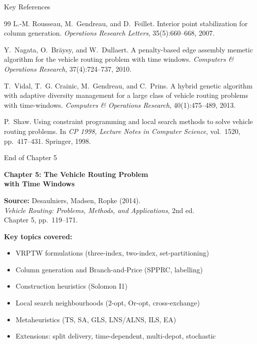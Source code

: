 \documentclass[aspectratio=169,10pt]{beamer}
\begin{document}
\begin{frame}[allowframebreaks]{Key References}
\begin{thebibliography}{99}
  L.-M. Rousseau, M.~Gendreau, and D.~Feillet.
  \newblock Interior point stabilization for column generation.
  \newblock \textit{Operations Research Letters}, 35(5):660--668, 2007.

  Y.~Nagata, O.~Br\"aysy, and W.~Dullaert.
  \newblock A penalty-based edge assembly memetic algorithm for the vehicle
    routing problem with time windows.
  \newblock \textit{Computers \& Operations Research}, 37(4):724--737, 2010.

  T.~Vidal, T.~G. Crainic, M.~Gendreau, and C.~Prins.
  \newblock A hybrid genetic algorithm with adaptive diversity management for a
    large class of vehicle routing problems with time-windows.
  \newblock \textit{Computers \& Operations Research}, 40(1):475--489, 2013.

  P.~Shaw.
  \newblock Using constraint programming and local search methods to solve
    vehicle routing problems.
  \newblock In \textit{CP 1998, Lecture Notes in Computer Science}, vol.~1520,
    pp.~417--431. Springer, 1998.

\end{thebibliography}

\end{frame}

\begin{frame}[allowframebreaks]{End of Chapter 5}
  \begin{center}
    \Large\textbf{Chapter 5: The Vehicle Routing Problem\\with Time Windows}

    \bigskip
    \normalsize
    \textbf{Source:} Desaulniers, Madsen, Ropke (2014).\\
    \textit{Vehicle Routing: Problems, Methods, and Applications}, 2nd ed.\\
    Chapter 5, pp.\ 119--171.

    \bigskip
    \textbf{Key topics covered:}
    \begin{itemize}
      \item VRPTW formulations (three-index, two-index, set-partitioning)
      \item Column generation and Branch-and-Price (SPPRC, labelling)
      \item Construction heuristics (Solomon I1)
      \item Local search neighbourhoods (2-opt, Or-opt, cross-exchange)
      \item Metaheuristics (TS, SA, GLS, LNS/ALNS, ILS, EA)
      \item Extensions: split delivery, time-dependent, multi-depot, stochastic
    \end{itemize}
  \end{center}
\end{frame}
\end{document}

